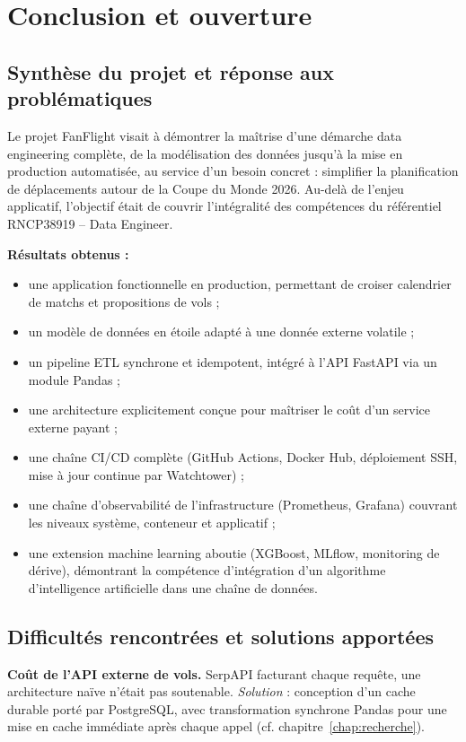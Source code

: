 \documentclass[11pt,a4paper]{report}
\begin{document}
\chapter{Conclusion et ouverture}

\section{Synthèse du projet et réponse aux problématiques}

Le projet FanFlight visait à démontrer la maîtrise d'une démarche data engineering complète, de la modélisation des données jusqu'à la mise en production automatisée, au service d'un besoin concret : simplifier la planification de déplacements autour de la Coupe du Monde 2026. Au-delà de l'enjeu applicatif, l'objectif était de couvrir l'intégralité des compétences du référentiel RNCP38919 -- Data Engineer.

\textbf{Résultats obtenus :}
\begin{itemize}
  \item une application fonctionnelle en production, permettant de croiser calendrier de matchs et propositions de vols ;
  \item un modèle de données en étoile adapté à une donnée externe volatile ;
  \item un pipeline ETL synchrone et idempotent, intégré à l'API FastAPI via un module Pandas ;
  \item une architecture explicitement conçue pour maîtriser le coût d'un service externe payant ;
  \item une chaîne CI/CD complète (GitHub Actions, Docker Hub, déploiement SSH, mise à jour continue par Watchtower) ;
  \item une chaîne d'observabilité de l'infrastructure (Prometheus, Grafana) couvrant les niveaux système, conteneur et applicatif ;
  \item une extension machine learning aboutie (XGBoost, MLflow, monitoring de dérive), démontrant la compétence d'intégration d'un algorithme d'intelligence artificielle dans une chaîne de données.
\end{itemize}

\section{Difficultés rencontrées et solutions apportées}

\textbf{Coût de l'API externe de vols.} SerpAPI facturant chaque requête, une architecture naïve n'était pas soutenable. \emph{Solution} : conception d'un cache durable porté par PostgreSQL, avec transformation synchrone Pandas pour une mise en cache immédiate après chaque appel (cf. chapitre~\ref{chap:recherche}).
\end{document}
